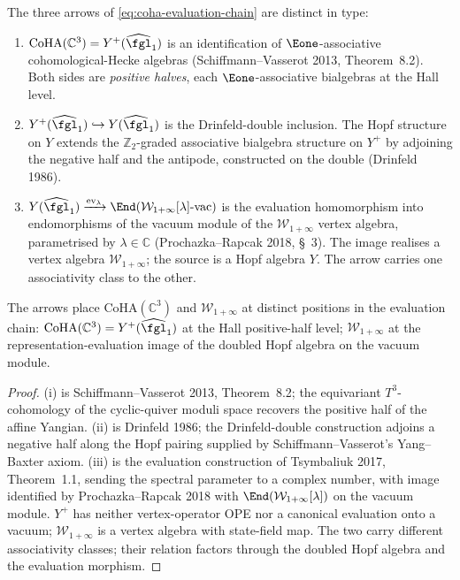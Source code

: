 \begin{theorem}
\label{thm:coha-three-arrows}
The three arrows of \eqref{eq:coha-evaluation-chain} are distinct in
type:
\begin{enumerate}[label=\textup{(\roman*)}]
\item $\mathrm{CoHA}(\mathbb C^3) = Y^{+}(\widehat{\fgl}_1)$ is an
identification of $\Eone$-associative cohomological-Hecke algebras
(Schiffmann--Vasserot 2013, Theorem~8.2). Both sides are
\emph{positive halves}, each $\Eone$-associative bialgebras at the
Hall level.
\item $Y^{+}(\widehat{\fgl}_1) \hookrightarrow Y(\widehat{\fgl}_1)$
is the Drinfeld-double inclusion. The Hopf structure on $Y$ extends
the $\mathbb Z_2$-graded associative bialgebra structure on $Y^+$
by adjoining the negative half and the antipode, constructed on the
double (Drinfeld 1986).
\item $Y(\widehat{\fgl}_1) \xrightarrow{\mathrm{ev}_{\lambda}}
\End(\mathcal W_{1+\infty}[\lambda]\text{-vac})$ is the evaluation
homomorphism into endomorphisms of the vacuum module of the
$\mathcal W_{1+\infty}$ vertex algebra, parametrised by
$\lambda \in \mathbb C$ (Prochazka--Rapcak 2018, \S~3). The image
realises a vertex algebra $\mathcal W_{1 + \infty}$; the source is
a Hopf algebra $Y$. The arrow carries one associativity class to the
other.
\end{enumerate}
The arrows place $\mathrm{CoHA}(\mathbb C^3)$ and
$\mathcal W_{1 + \infty}$ at distinct positions in the evaluation
chain: $\mathrm{CoHA}(\mathbb C^3) = Y^+(\widehat{\fgl}_1)$ at the
Hall positive-half level; $\mathcal W_{1 + \infty}$ at the
representation-evaluation image of the doubled Hopf algebra on the
vacuum module.
\end{theorem}

\begin{proof}
(i) is Schiffmann--Vasserot 2013, Theorem~8.2; the equivariant
$T^{3}$-cohomology of the cyclic-quiver moduli space recovers the
positive half of the affine Yangian. (ii) is Drinfeld 1986; the
Drinfeld-double construction adjoins a negative half along the Hopf
pairing supplied by Schiffmann--Vasserot's Yang--Baxter axiom. (iii) is
the evaluation construction of Tsymbaliuk 2017, Theorem~1.1, sending
the spectral parameter to a complex number, with image identified by
Prochazka--Rapcak 2018 with $\End(\mathcal W_{1+\infty}[\lambda])$ on
the vacuum module. $Y^{+}$ has neither vertex-operator OPE nor a
canonical evaluation onto a vacuum; $\mathcal W_{1+\infty}$ is a
vertex algebra with state-field map. The two carry different
associativity classes; their relation factors through the doubled
Hopf algebra and the evaluation morphism.
\end{proof}

